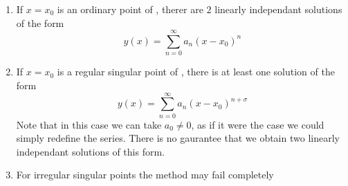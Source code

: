 \documentclass{article}
\begin{document}
\begin{thm}
    \begin{enumerate}[label=(\arabic*)]
        \item If $x = x_0$ is an ordinary point of , therer are $2$ linearly independant solutions of the form
        \[
            y(x) = \sum_{n=0}^{\infty} a_n (x - x_0)^n  
        \]
        \item If $x = x_0$ is a regular singular point of , there is at least one solution of the form
        \[
            y(x) = \sum_{n=0}^{\infty} a_n (x - x_0)^{n + \sigma} \tag{$a_0 \neq 0$}
        \]
        Note that in this case we can take $a_0 \neq 0$, as if it were the case we could simply redefine the series.
        There is no gaurantee that we obtain two linearly independant solutions of this form.
        \item For irregular singular points the method may fail completely
    \end{enumerate}
\end{thm}
\end{document}
